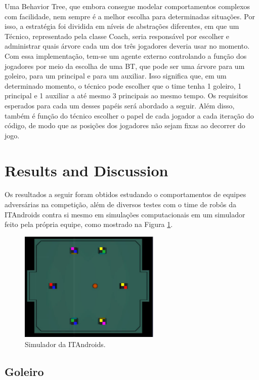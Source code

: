 \documentclass[conference]{IEEEtran}
\begin{document}
Uma Behavior Tree, que embora consegue modelar comportamentos complexos com facilidade, nem sempre é a melhor escolha para determinadas situações. Por isso, a estratégia foi dividida em níveis de abstrações diferentes, em que um Técnico, representado pela classe Coach, seria responsável por escolher e administrar quais árvore cada um dos três jogadores deveria usar no momento.
Com essa implementação, tem-se um agente externo controlando a função dos jogadores por meio da escolha de uma BT, que pode ser uma árvore para um goleiro, para um principal e para um auxiliar. Isso significa que, em um determinado momento, o técnico pode escolher que o time tenha 1 goleiro, 1 principal e 1 auxiliar a até mesmo 3 principais ao mesmo tempo. Os requisitos esperados para cada um desses papéis será abordado a seguir. Além disso, também é função do técnico escolher o papel de cada jogador a cada iteração do código, de modo que as posições dos jogadores não sejam fixas ao decorrer do jogo.

\section{Results and Discussion}

Os resultados a seguir foram obtidos estudando o comportamentos de equipes adversárias na competição, além de diversos testes com o time de robôs da ITAndroids contra si mesmo em simulações computacionais em um simulador feito pela própria equipe, como mostrado na Figura \ref{fig:simulator}.

\begin{figure}[H]
	\centering
	\includegraphics[width=0.6\textwidth]{figures/SimulatorWithoutButtons.png}
	\caption{Simulador da ITAndroids.}
	\label{fig:simulator}
\end{figure}

\subsection{Goleiro}
\end{document}
